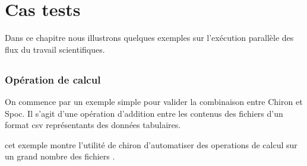 \chapter{Cas tests}


Dans ce chapitre nous illustrons quelques exemples sur l'exécution parallèle des flux du travail scientifiques.  




\section{}

\subsection{ Opération de calcul }


On commence par un exemple simple pour valider la combinaison entre Chiron et Spoc. Il s'agit d'une opération d'addition entre les contenus des fichiers d'un format csv représentants des données tabulaires.



cet exemple montre l'utilité de chiron d'automatiser des operations de calcul sur un grand nombre des fichiers .





